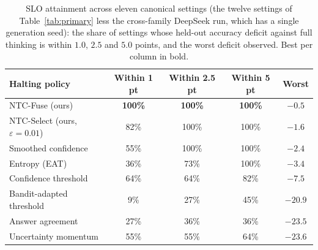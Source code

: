 \documentclass[acmsmall]{acmart}
\newcommand{\up}[1]{\textcolor{gd}{#1}}
\newcommand{\dn}[1]{\textcolor{bd}{#1}}
\theoremstyle{acmdefinition}%
\theoremstyle{acmplain}}{}%
\begin{document}
\begin{table}[t]
\caption{SLO attainment across eleven canonical settings (the twelve settings of Table~\ref{tab:primary} less the cross-family DeepSeek run, which has a single generation seed): the share of settings whose held-out accuracy deficit against full thinking is within $1.0$, $2.5$ and $5.0$ points, and the worst deficit observed. Best per column in bold.}
\label{tab:slo}
\small
\begin{tabular}{@{}lcccc@{}}
\toprule
\textbf{Halting policy} & \textbf{Within 1 pt} & \textbf{Within 2.5 pt} & \textbf{Within 5 pt} & \textbf{Worst} \\
\midrule
NTC-Fuse (ours)                 & \textbf{100\%} & \textbf{100\%} & \textbf{100\%} & \up{\textbf{$-0.5$}} \\
NTC-Select (ours, $\varepsilon{=}0.01$) & 82\%  & 100\% & 100\% & \up{$-1.6$} \\
Smoothed confidence               & 55\%  & 100\% & 100\% & $-2.4$ \\
Entropy (EAT)                     & 36\%  & 73\%  & 100\% & $-3.4$ \\
Confidence threshold              & 64\%  & 64\%  & 82\%  & \dn{$-7.5$} \\
Bandit-adapted threshold          & 9\%   & 27\%  & 45\%  & \dn{$-20.9$} \\
Answer agreement                  & 27\%  & 36\%  & 36\%  & \dn{$-23.5$} \\
Uncertainty momentum              & 55\%  & 55\%  & 64\%  & \dn{$-23.6$} \\
\bottomrule
\end{tabular}
\end{table}
\end{document}
